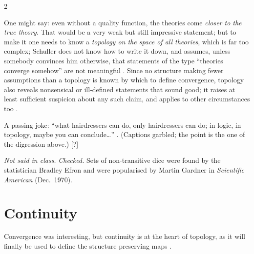 \begin{paracol}{2}
\begin{secondary}
One might say: even without a quality function, the theories come \emph{closer to the true theory}. That would be a very weak but
still impressive statement; but to make it one needs to know a \emph{topology on the space of all theories}, which is far too
complex; Schuller does not know how to write it down, and assumes, unless somebody convinces him otherwise, that statements of the
type ``theories converge somehow'' are not meaningful . Since no
structure making fewer assumptions than a topology is known by which to define convergence, topology also reveals nonsensical or
ill-defined statements that sound good; it raises at least sufficient suspicion about any such claim, and applies to other
circumstances too .
\end{secondary}
\begin{aside}[Hairdressers]
A passing joke: ``what hairdressers can do, only hairdressers can do; in logic, in topology, maybe you can conclude\dots''
. (Captions garbled; the point is the one of the digression above.) [?]
\end{aside}
\begin{history}
\emph{Not said in class.} \emph{Checked.} Sets of non-transitive dice were found by the statistician Bradley Efron and were
popularised by Martin Gardner in \emph{Scientific American} (Dec.\ 1970).
\end{history}

\section{Continuity}\label{sec:to-cont}

Convergence was interesting, but continuity is at the heart of topology, as it will finally be used to define the structure
preserving maps .


\end{paracol}
